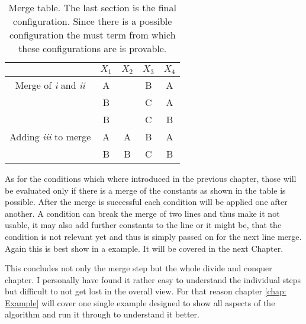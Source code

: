 \vspace{0.2cm}
\begin{table}[ht]
\centering
\begin{tabular}{ c c c c c }
	 & $X_1$ & $X_2$ & $X_3$ & $X_4$\\
 	\hline
 	Merge of \emph{i} and \emph{ii}
 				& A 	& 	 	& B 	& A \\
 	  			& B 	& 	 	& C 	& A \\
 	  			& B 	& 	 	& C 	& B \\
 	\hline	  
 	Adding \emph{iii} to merge
 			  	& A 	& A		& B 	& A\\
 				& B 	& B		& C 	& B\\
 	\hline
 	\hline 
\end{tabular}
\caption{Merge table. The last section is the final configuration. Since there is a possible configuration the must term from which these configurations are is provable.}
\end{table}

As for the conditions which where introduced in the previous chapter, those will be evaluated only if there is a merge of the constants as shown in the table is possible. After the merge is successful each condition will be applied one after another. A condition can break the merge of two lines and thus make it not usable, it may also add further constants to the line or it might be, that the condition is not relevant yet and thus is simply passed on for the next line merge. Again this is best show in a example. It will be covered in the next Chapter.


\par This concludes not only the merge step but the whole divide and conquer chapter. I personally have found it rather easy to understand the individual steps but difficult to not get lost in the overall view. For that reason chapter \ref{chap: Example} will cover one single example designed to show all aspects of the algorithm and run it through to understand it better.